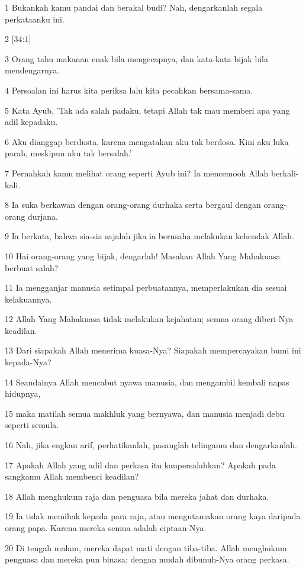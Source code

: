 \par 1 Bukankah kamu pandai dan berakal budi? Nah, dengarkanlah segala perkataanku ini.
\par 2 [34:1]
\par 3 Orang tahu makanan enak bila mengecapnya, dan kata-kata bijak bila mendengarnya.
\par 4 Persoalan ini harus kita periksa lalu kita pecahkan bersama-sama.
\par 5 Kata Ayub, 'Tak ada salah padaku, tetapi Allah tak mau memberi apa yang adil kepadaku.
\par 6 Aku dianggap berdusta, karena mengatakan aku tak berdosa. Kini aku luka parah, meskipun aku tak bersalah.'
\par 7 Pernahkah kamu melihat orang seperti Ayub ini? Ia mencemooh Allah berkali-kali.
\par 8 Ia suka berkawan dengan orang-orang durhaka serta bergaul dengan orang-orang durjana.
\par 9 Ia berkata, bahwa sia-sia sajalah jika ia berusaha melakukan kehendak Allah.
\par 10 Hai orang-orang yang bijak, dengarlah! Masakan Allah Yang Mahakuasa berbuat salah?
\par 11 Ia mengganjar manusia setimpal perbuatannya, memperlakukan dia sesuai kelakuannya.
\par 12 Allah Yang Mahakuasa tidak melakukan kejahatan; semua orang diberi-Nya keadilan.
\par 13 Dari siapakah Allah menerima kuasa-Nya? Siapakah mempercayakan bumi ini kepada-Nya?
\par 14 Seandainya Allah mencabut nyawa manusia, dan mengambil kembali napas hidupnya,
\par 15 maka matilah semua makhluk yang bernyawa, dan manusia menjadi debu seperti semula.
\par 16 Nah, jika engkau arif, perhatikanlah, pasanglah telingamu dan dengarkanlah.
\par 17 Apakah Allah yang adil dan perkasa itu kaupersalahkan? Apakah pada sangkamu Allah membenci keadilan?
\par 18 Allah menghukum raja dan penguasa bila mereka jahat dan durhaka.
\par 19 Ia tidak memihak kepada para raja, atau mengutamakan orang kaya daripada orang papa. Karena mereka semua adalah ciptaan-Nya.
\par 20 Di tengah malam, mereka dapat mati dengan tiba-tiba. Allah menghukum penguasa dan mereka pun binasa; dengan mudah dibunuh-Nya orang perkasa.
